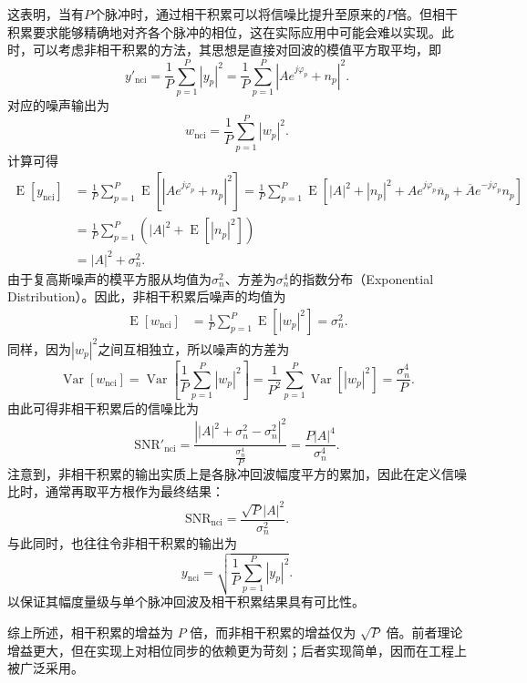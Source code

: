 这表明，当有\( P \)个脉冲时，通过相干积累可以将信噪比提升至原来的\( P \)倍。但相干积累要求能够精确地对齐各个脉冲的相位，这在实际应用中可能会难以实现。此时，可以考虑非相干积累的方法，其思想是直接对回波的模值平方取平均，即
\[
    y\prime_{\mathrm{nci}} = \frac{1}{P} \sum_{p=1}^P |y_p|^2 = \frac{1}{P} \sum_{p=1}^P \left| A e^{j \varphi_p} + n_p \right|^2.
\]
对应的噪声输出为
\[
    w_{\mathrm{nci}} = \frac{1}{P} \sum_{p=1}^P |w_p|^2.
\]
计算可得
\[
    \begin{split}
        \operatorname{E}[y_{\mathrm{nci}}] & = \frac{1}{P} \sum_{p=1}^P \operatorname{E}\left[ |A e^{j \varphi_p} + n_p|^2 \right] = \frac{1}{P} \sum_{p=1}^P \operatorname{E} \left[ |A|^2 + |n_p|^2 + A e^{j \varphi_p} \overline{n}_p + \overline{A} e^{-j \varphi_p} n_p \right] \\
                                           & = \frac{1}{P} \sum_{p=1}^P \left( |A|^2 + \operatorname{E}[|n_p|^2] \right)                                                                                                                                                             \\
                                           & = |A|^2 + \sigma^2_n.
    \end{split}
\]
由于复高斯噪声的模平方服从均值为\( \sigma^2_n \)、方差为\( \sigma^4_n \)的指数分布（Exponential Distribution）。因此，非相干积累后噪声的均值为
\[
    \begin{split}
        \operatorname{E}[w_{\mathrm{nci}}] & =\frac{1}{P}  \sum_{p=1}^P \operatorname{E}\left[ |w_p|^2 \right] = \sigma^2_n.
    \end{split}
\]
同样，因为\( |w_p|^2 \)之间互相独立，所以噪声的方差为
\[
    \operatorname{Var}[w_{\mathrm{nci}}] = \operatorname{Var}\left[ \frac{1}{P} \sum_{p=1}^P |w_p|^2\right] = \frac{1}{P^2}\sum_{p=1}^P \operatorname{Var}\left[ |w_p|^2\right] = \frac{\sigma^4_n}{P}.
\]
由此可得非相干积累后的信噪比为
\[
    \mathrm{SNR}'_{\mathrm{nci}} = \frac{\left||A|^2 + \sigma^2_n - \sigma^2_n\right|^2}{\frac{\sigma^4_n}{P}} = \frac{P |A|^4}{\sigma^4_n}.
\]
注意到，非相干积累的输出实质上是各脉冲回波幅度平方的累加，因此在定义信噪比时，通常再取平方根作为最终结果：
\[
    \mathrm{SNR}_{\mathrm{nci}} = \frac{\sqrt{P} |A|^2}{\sigma^2_n}.
\]
与此同时，也往往令非相干积累的输出为
\[
    y_{\mathrm{nci}} = \sqrt{\frac{1}{P} \sum_{p=1}^P |y_p|^2}.
\]
以保证其幅度量级与单个脉冲回波及相干积累结果具有可比性。

综上所述，相干积累的增益为 \( P \) 倍，而非相干积累的增益仅为 \(\sqrt{P}\) 倍。前者理论增益更大，但在实现上对相位同步的依赖更为苛刻；后者实现简单，因而在工程上被广泛采用。

